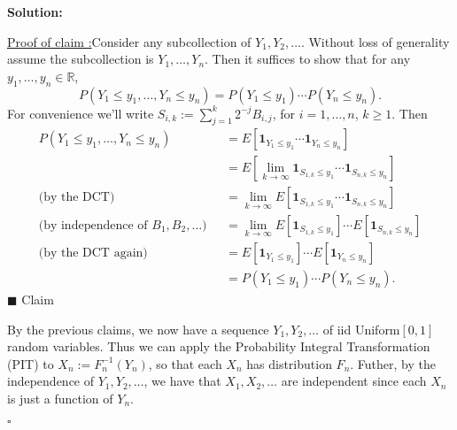 \documentclass[12pt]{article}
\newcounter{ProofCounter}
\newcounter{ClaimCounter}[ProofCounter]
\newenvironment{Solution}{\stepcounter{ProofCounter}\textbf{Solution:}}{\hfill$\square$}
\newenvironment{claim}[1]{\vspace{1mm}\stepcounter{ClaimCounter}\par\noindent\underline{\bf Claim \theClaimCounter:}\space#1}{}
\newenvironment{claimproof}[1]{\par\noindent\underline{Proof of claim \theClaimCounter:}\space#1}{\hfill $\blacksquare$ Claim \theClaimCounter}
\newcommand{\linf}[1]{\lim_{#1\rightarrow\infty}}
\begin{document}
\begin{Solution}
  \begin{claimproof}
    Consider any subcollection of $Y_1, Y_2, \dots$. Without loss of generality assume the subcollection is $Y_1, \dots, Y_n$. Then it suffices to show that for any $y_1, \dots, y_n \in \mathbb{R}$,
    \[
      P(Y_1 \leq y_1, \dots, Y_n \leq y_n) = P(Y_1 \leq y_1) \cdots P(Y_n \leq y_n).
    \]
    For convenience we'll write $S_{i,k} := \sum_{j=1}^{k}2^{-j}B_{i,j}$, for $i = 1, \dots, n$, $k \geq 1$. Then
    \begin{align*}
      P(Y_1 \leq y_1, \dots, Y_n \leq y_n) & = E[\bm{1}_{Y_1 \leq y_1} \cdots \bm{1}_{Y_n \leq y_n}] \\
      & = E\left[ \linf{k} \bm{1}_{S_{1,k}\leq y_1} \cdots \bm{1}_{S_{n,k}\leq y_n} \right] \\
      \text{(by the DCT)}\ \ \  & = \linf{k} E \left[ \bm{1}_{S_{1,k}\leq y_1} \cdots \bm{1}_{S_{n,k}\leq y_n} \right] \\
      \text{(by independence of $B_1, B_2, \dots$)} \ \ \  & = \linf{k} E \left[ \bm{1}_{S_{1,k}\leq y_1} \right] \cdots E\left[\bm{1}_{S_{n,k}\leq y_n} \right] \\
      \text{(by the DCT again)} \ \ \  & = E \left[ \bm{1}_{Y_1 \leq y_1} \right] \cdots E\left[\bm{1}_{Y_n \leq y_n} \right] \\
      & = P(Y_1 \leq y_1) \cdots P(Y_n \leq y_n).
    \end{align*}
  \end{claimproof}

  By the previous claims, we now have a sequence $Y_1, Y_2, \dots$ of iid Uniform$[0,1]$ random variables. Thus we can apply the Probability Integral Transformation (PIT) to $X_n := F_n^{-1}(Y_n)$, so that each $X_n$ has distribution $F_n$. Futher, by the independence of $Y_1, Y_2, \dots$, we have that $X_1, X_2, \dots$ are independent since each $X_n$ is just a function of $Y_n$.

\end{Solution}

\end{document}
